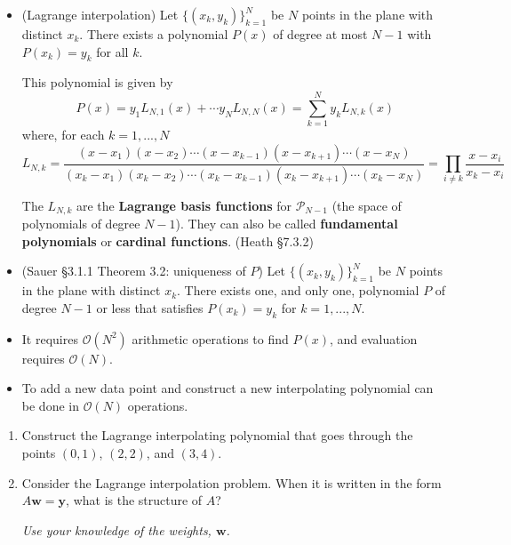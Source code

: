 \documentclass[12pt,letterpaper,noanswers]{exam}
\newcommand{\vc}[1]{\boldsymbol{#1}}
\begin{document}
\begin{tcolorbox}
\begin{itemize}
\itemsep0pt
\item (Lagrange interpolation)
Let $\{(x_k,y_k)\}_{k=1}^N$ be $N$ points in the plane with distinct $x_k$.  There exists a polynomial $P(x)$ of degree at most $N-1$
with $P(x_k) = y_k$ for all $k$.

This polynomial is given by 
\[
P(x) = y_1L_{N,1}(x) + \cdots y_N L_{N,N}(x) = \sum_{k=1}^N y_k L_{N,k}(x)
\]
where, for each $k=1,...,N$
\[
L_{N,k} = \frac{(x-x_1)(x-x_2)\cdots(x-x_{k-1})(x-x_{k+1})\cdots(x-x_N)}
{(x_k-x_1)(x_k-x_2)\cdots(x_k-x_{k-1})(x_k-x_{k+1})\cdots(x_k-x_N)}
=\prod_{i\ne k} \frac{x-x_i}{x_k-x_i}
\]

The $L_{N,k}$ are the \textbf{Lagrange basis functions} for $\mathcal{P}_{N-1}$ (the space of polynomials of degree $N-1$).  They can also be called \textbf{fundamental polynomials} or \textbf{cardinal functions}.  (Heath \S 7.3.2)

\item (Sauer \S 3.1.1 Theorem 3.2: uniqueness of $P$) Let $\{(x_k,y_k)\}_{k=1}^N$ be $N$ points in the plane with distinct $x_k$.  There exists one, and only one, polynomial $P$ of degree $N-1$ or less that satisfies $P(x_k) = y_k$ for $k=1,...,N$.

\item It requires $\mathcal{O}(N^2)$ arithmetic operations to find $P(x)$, and evaluation requires $\mathcal{O}(N)$.

\item To add a new data point and construct a new interpolating polynomial can be done in $\mathcal{O}(N)$ operations.
\end{itemize}

 
\end{tcolorbox}

\begin{enumerate}[resume=classQ]

\item Construct the Lagrange interpolating polynomial that goes through the points $(0,1)$, $(2,2)$, and $(3,4)$.  %

\vspace{1in}

\item Consider the Lagrange interpolation problem.  When it is written in the form $A\vc{w} = \vc{y}$, what is the structure of $A$?

\emph{Use your knowledge of the weights, $\vc{w}$.}
\vspace{0.5in}
\end{enumerate}
\end{document}
